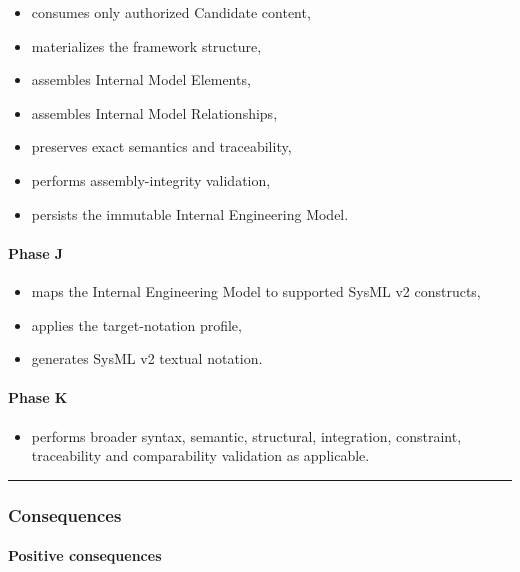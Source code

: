\begin{itemize}
\tightlist
\item
  consumes only authorized Candidate content,
\item
  materializes the framework structure,
\item
  assembles Internal Model Elements,
\item
  assembles Internal Model Relationships,
\item
  preserves exact semantics and traceability,
\item
  performs assembly-integrity validation,
\item
  persists the immutable Internal Engineering Model.
\end{itemize}

\hypertarget{phase-j}{%
\paragraph{Phase J}\label{phase-j}}

\begin{itemize}
\tightlist
\item
  maps the Internal Engineering Model to supported SysML v2 constructs,
\item
  applies the target-notation profile,
\item
  generates SysML v2 textual notation.
\end{itemize}

\hypertarget{phase-k}{%
\paragraph{Phase K}\label{phase-k}}

\begin{itemize}
\tightlist
\item
  performs broader syntax, semantic, structural, integration, constraint, traceability and comparability validation as applicable.
\end{itemize}

\begin{center}\rule{0.5\linewidth}{0.5pt}\end{center}

\hypertarget{consequences-4}{%
\subsubsection{Consequences}\label{consequences-4}}

\hypertarget{positive-consequences-4}{%
\paragraph{Positive consequences}\label{positive-consequences-4}}

